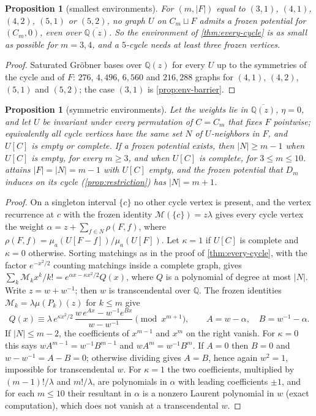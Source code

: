 \documentclass[11pt]{amsart}
\theoremstyle{plain}
\newtheorem{proposition}[theorem]{Proposition}
\theoremstyle{definition}
\theoremstyle{remark}
\numberwithin{equation}{section}
\newcommand{\QQ}{\mathbb{Q}}
\newcommand{\Qz}{\QQ(z)}
\newcommand{\Qzbar}{\overline{\QQ(z)}}
\newcommand{\Mpot}{\mathcal{M}}           %
\begin{document}
\begin{proposition}[smallest environments]\label{prop:smallest-env}
For $(m,|F|)$ equal to $(3,1)$, $(4,1)$, $(4,2)$, $(5,1)$ or $(5,2)$, no graph $U$ on $C_m\sqcup F$ admits a frozen potential for $(C_m,0)$, even over $\Qzbar$. So the environment of \cref{thm:every-cycle} is as small as possible for $m=3,4$, and a $5$-cycle needs at least three frozen vertices.
\end{proposition}
\begin{proof}
Saturated Gr\"obner bases over $\Qz$ for every $U$ up to the symmetries of the cycle and of $F$: $276$, $4{,}496$, $6{,}560$ and $216{,}288$ graphs for $(4,1)$, $(4,2)$, $(5,1)$ and $(5,2)$; the case $(3,1)$ is \cref{prop:env-barrier}.
\end{proof}

\begin{proposition}[symmetric environments]\label{prop:symmetric-env}
Let the weights lie in $\Qzbar$, $\eta=0$, and let $U$ be invariant under every permutation of $C=C_m$ that fixes $F$ pointwise; equivalently all cycle vertices have the same set $N$ of $U$-neighbors in $F$, and $U[C]$ is empty or complete. If a frozen potential exists, then $|N|\ge m-1$ when $U[C]$ is empty, for every $m\ge3$, and when $U[C]$ is complete, for $3\le m\le10$.  attains $|F|=|N|=m-1$ with $U[C]$ empty, and the frozen potential that $D_m$ induces on its cycle \textup{(}\cref{prop:restriction}\textup{)} has $|N|=m+1$.
\end{proposition}
\begin{proof}
On a singleton interval $\{c\}$ no other cycle vertex is present, and the vertex recurrence at $c$ with the frozen identity $\Mpot(\{c\})=z\lambda$ gives every cycle vertex the weight $\alpha=z+\sum_{f\in N}\rho(F,f)$, where $\rho(F,f)=\mu_a(U[F-f])/\mu_a(U[F])$. Let $\kappa=1$ if $U[C]$ is complete and $\kappa=0$ otherwise. Sorting matchings as in the proof of \cref{thm:every-cycle}, with the factor $e^{-x^2/2}$ counting matchings inside a complete graph, gives $\sum_k\Mpot_kx^{k}/k!=e^{\alpha x-\kappa x^{2}/2}Q(x)$, where $Q$ is a polynomial of degree at most $|N|$. Write $z=w+w^{-1}$; then $w$ is transcendental over $\QQ$. The frozen identities $\Mpot_k=\lambda\mu(P_k)(z)$ for $k\le m$ give
\[
Q(x)\equiv\lambda\,e^{\kappa x^{2}/2}\,\frac{w\,e^{Ax}-w^{-1}e^{Bx}}{w-w^{-1}}\pmod{x^{m+1}},\qquad A=w-\alpha,\quad B=w^{-1}-\alpha.
\]
If $|N|\le m-2$, the coefficients of $x^{m-1}$ and $x^{m}$ on the right vanish. For $\kappa=0$ this says $wA^{m-1}=w^{-1}B^{m-1}$ and $wA^{m}=w^{-1}B^{m}$. If $A=0$ then $B=0$ and $w-w^{-1}=A-B=0$; otherwise dividing gives $A=B$, hence again $w^{2}=1$, impossible for transcendental $w$. For $\kappa=1$ the two coefficients, multiplied by $(m-1)!/\lambda$ and $m!/\lambda$, are polynomials in $\alpha$ with leading coefficients $\pm1$, and for each $m\le10$ their resultant in $\alpha$ is a nonzero Laurent polynomial in $w$ (exact computation), which does not vanish at a transcendental $w$.
\end{proof}
\end{document}
